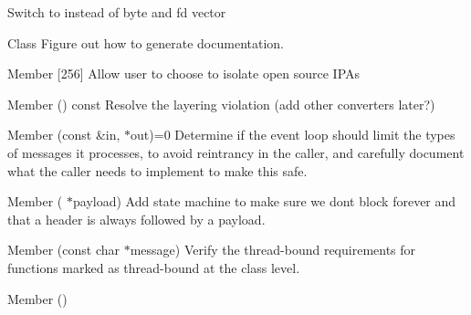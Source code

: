 \begin{DoxyRefList}
\label{todo__todo000029}%
%
Switch to  instead of byte and fd vector 
\item[Class \doxylink{classlibcamera_1_1IPAInterface}{libcamera\+::IPAInterface} ]\label{todo__todo000033}%
%
Figure out how to generate  documentation.  
\item[Member \doxylink{structlibcamera_1_1IPAModuleInfo_ac8fb4c26b65a2fbad350fc185445164d}{libcamera\+::IPAModule\+Info\+::name} \mbox{[}256\mbox{]}]\label{todo__todo000034}%
%
Allow user to choose to isolate open source IPAs  
\item[Member \doxylink{classlibcamera_1_1IPCMessage_a18d9502a924db483ee1deffe37de8117}{libcamera\+::IPCMessage\+::payload} () const]\label{todo__todo000035}%
%
Resolve the layering violation (add other converters later?)  
\item[Member \doxylink{classlibcamera_1_1IPCPipe_a4071e1ef36dfb902b766b5f28330457b}{libcamera\+::IPCPipe\+::send\+Sync} (const \doxylink{classlibcamera_1_1IPCMessage}{IPCMessage} \&in, \doxylink{classlibcamera_1_1IPCMessage}{IPCMessage} \texorpdfstring{$\ast$}{*}out)=0]\label{todo__todo000036}%
%
Determine if the event loop should limit the types of messages it processes, to avoid reintrancy in the caller, and carefully document what the caller needs to implement to make this safe.  
\item[Member \doxylink{classlibcamera_1_1IPCUnixSocket_a11995aca6423a568e6d1303dc80cd239}{libcamera\+::IPCUnix\+Socket\+::receive} (\doxylink{structlibcamera_1_1IPCUnixSocket_1_1Payload}{Payload} \texorpdfstring{$\ast$}{*}payload)]\label{todo__todo000037}%
%
Add state machine to make sure we don\textquotesingle{}t block forever and that a header is always followed by a payload. 
\item[Member \doxylink{classlibcamera_1_1Object_a6e81f2a2524dbe12daed49597cf66a57}{libcamera\+::Object\+::assert\+Thread\+Bound} (const char \texorpdfstring{$\ast$}{*}message)]\label{todo__todo000012}%
%
Verify the thread-\/bound requirements for functions marked as thread-\/bound at the class level. 
\item[Member \doxylink{classlibcamera_1_1Request_ac620539cc50a28bd9ff9f8f697eb86c3}{libcamera\+::Request\+::metadata} ()]\label{todo__todo000042}%
%

\end{DoxyRefList}
